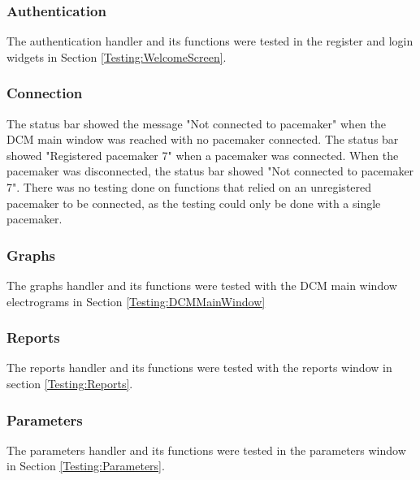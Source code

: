 \documentclass[12pt]{article}
\begin{document}
\subsubsection{Authentication}
The authentication handler and its functions were tested in the register and login widgets in Section \ref{Testing:WelcomeScreen}.

\subsubsection{Connection}
The status bar showed the message "Not connected to pacemaker" when the DCM main window was reached with no pacemaker connected. The status bar showed "Registered pacemaker 7" when a pacemaker was connected. When the pacemaker was disconnected, the status bar showed "Not connected to pacemaker 7". There was no testing done on functions that relied on an unregistered pacemaker to be connected, as the testing could only be done with a single pacemaker.

\subsubsection{Graphs}
The graphs handler and its functions were tested with the DCM main window electrograms in Section \ref{Testing:DCMMainWindow}

\subsubsection{Reports}
The reports handler and its functions were tested with the reports window in section \ref{Testing:Reports}.

\subsubsection{Parameters}
The parameters handler and its functions were tested in the parameters window in Section \ref{Testing:Parameters}.
\end{document}
